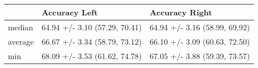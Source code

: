 \begin{tabular}{lll}
\toprule
{} &                  Accuracy Left &                 Accuracy Right \\
\midrule
median  &  64.94 +/- 3.10 (57.29, 70.41) &  64.94 +/- 3.16 (58.99, 69.92) \\
average &  66.67 +/- 3.34 (58.79, 73.12) &  66.10 +/- 3.09 (60.63, 72.50) \\
min     &  68.09 +/- 3.53 (61.62, 74.78) &  67.05 +/- 3.88 (59.39, 73.57) \\
\bottomrule
\end{tabular}
